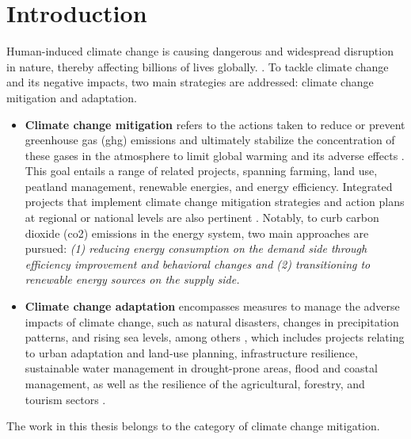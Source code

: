 \chapter{Introduction}

Human-induced climate change is causing dangerous and widespread disruption in nature, thereby affecting billions of lives globally. \cite{ipcc}. 
To tackle climate change and its negative impacts, two main strategies are addressed: climate change mitigation and adaptation.

\begin{itemize}
  \item \textbf{Climate change mitigation} refers to the actions taken to reduce or prevent greenhouse gas (\gls{ghg}) emissions and ultimately stabilize the concentration of these gases in the atmosphere to limit global warming and its adverse effects \cite{handbook}.
  This goal entails a range of related projects, spanning farming, land use, peatland management, renewable energies, and energy efficiency. Integrated projects that implement climate change mitigation strategies and action plans at regional or national levels are also pertinent \cite{ec}.
  Notably, to curb carbon dioxide (\gls{co2}) emissions in the energy system, two main approaches are pursued:
\emph{
  (1) reducing energy consumption on the demand side through efficiency improvement and behavioral changes and
  (2) transitioning to renewable energy sources on the supply side.
}
  \item \textbf{Climate change adaptation} encompasses measures to manage the adverse impacts of climate change, such as natural disasters, changes in precipitation patterns, and rising sea levels, among others \cite{handbook},
  which includes projects relating to urban adaptation and land-use planning, infrastructure resilience, sustainable water management in drought-prone areas, flood and coastal management, as well as the resilience of the agricultural, forestry, and tourism sectors \cite{ec}.  
\end{itemize}

The work in this thesis belongs to the category of climate change mitigation. 


